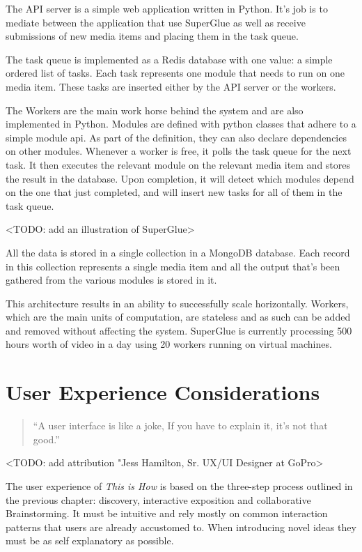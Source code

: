 The API server is a simple web application written in Python. It's job is to mediate between the application that use SuperGlue as well as receive submissions of new media items and placing them in the task queue. 

The task queue is implemented as a Redis database with one value: a simple ordered list of tasks. Each task represents one module that needs to run on one media item. These tasks are inserted either by the API server or the workers. 

The Workers are the main work horse behind the system and are also implemented in Python. Modules are defined with python classes that adhere to a simple module api. As part of the definition, they can also declare dependencies on other modules. Whenever a worker is free, it polls the task queue for the next task. It then executes the relevant module on the relevant media item and stores the result in the database. Upon completion, it will detect which modules depend on the one that just completed, and will insert new tasks for all of them in the task queue. 

<TODO: add an illustration of SuperGlue>

All the data is stored in a single collection in a MongoDB database. Each record in this collection represents a single media item and all the output that's been gathered from the various modules is stored in it. 

This architecture results in an ability to successfully scale horizontally. Workers, which are the main units of computation, are stateless and as such can be added and removed without affecting the system. SuperGlue is currently processing 500 hours worth of video in a day using 20 workers running on virtual machines.

\section{User Experience Considerations} 

\begin{quotation}
``A user interface is like a joke, If you have to explain it, it's not that good.''
\end{quotation}

<TODO: add attribution "Jess Hamilton, Sr. UX/UI Designer at GoPro>

The user experience of \textit{This is How} is based on the three-step process outlined in the previous chapter: discovery, interactive exposition and collaborative Brainstorming. It must be intuitive and rely mostly on common interaction patterns that users are already accustomed to. When introducing novel ideas they must be as self explanatory as possible. 

